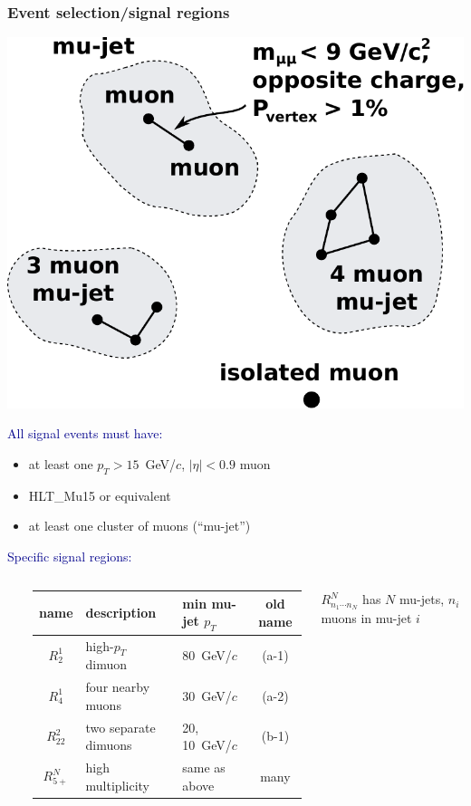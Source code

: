 \documentclass[compress]{beamer}
\begin{document}
\begin{frame}
\frametitle{Event selection/signal regions}

\vspace{0.25 cm}
\hfill \mbox{\includegraphics[width=0.37\linewidth]{closeness.pdf}\hspace{-0.6 cm}}

\vspace{-3.5 cm}
\textcolor{darkblue}{All signal events must have:}

\begin{itemize}
\item at least one $p_T > 15$~GeV/$c$, $|\eta| < 0.9$ muon
\item HLT\_Mu15 or equivalent
\item at least one cluster of muons (``mu-jet'')
\end{itemize}

\vspace{0.15 cm}
\textcolor{darkblue}{Specific signal regions:}

\vspace{0.1 cm}
\begin{columns}
\mbox{ }

\renewcommand{\arraystretch}{1.3}
\begin{tabular}{c l l c}
\hline name & description & min mu-jet $p_T$ & old name \\\hline
$R^1_2$ & high-$p_T$ dimuon & 80~GeV/$c$ & (a-1) \\
$R^1_4$ & four nearby muons & 30~GeV/$c$ & (a-2) \\
$R^2_{22}$ & two separate \mbox{dimuons\hspace{-0.3 cm}} & 20, 10~GeV/$c$ & (b-1) \\
$R^N_{5+}$ & high multiplicity & same as above & many \\\hline
\end{tabular}

\vspace{0.1 cm}
\hspace{0.2 cm} $R^N_{n_1 \cdots n_N}$ has $N$ mu-jets, $n_i$ muons in mu-jet $i$


\end{columns}
\end{frame}
\end{document}
